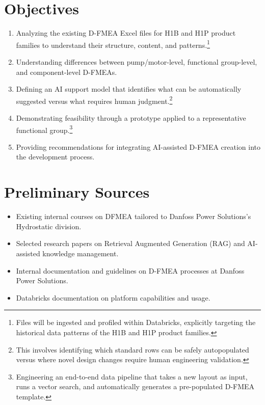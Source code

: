 
\section{Objectives}

\begin{enumerate}
    \item Analyzing the existing D-FMEA Excel files for H1B and H1P product families to understand their structure, content, and patterns.\footnote{Files will be ingested and profiled within Databricks, explicitly targeting the historical data patterns of the H1B and H1P product families.}
    
    \item Understanding differences between pump/motor-level, functional group-level, and component-level D-FMEAs. 
    
    \item Defining an AI support model that identifies what can be automatically suggested versus what requires human judgment.\footnote{This involves identifying which standard rows can be safely autopopulated versus where novel design changes require human engineering validation.}
    
    \item Demonstrating feasibility through a prototype applied to a representative functional group.\footnote{Engineering an end-to-end data pipeline that takes a new layout as input, runs a vector search, and automatically generates a pre-populated D-FMEA template.}
    
    \item Providing recommendations for integrating AI-assisted D-FMEA creation into the development process.
\end{enumerate}

 \section{Preliminary Sources}
\begin{itemize}
    \item Existing internal courses on DFMEA tailored to Danfoss Power Solutions's Hydrostatic division.
    \item Selected research papers on Retrieval Augmented Generation (RAG) and AI-assisted knowledge management.
    \item Internal documentation and guidelines on D-FMEA processes at Danfoss Power Solutions.
    \item Databricks documentation on platform capabilities and usage.
\end{itemize}
